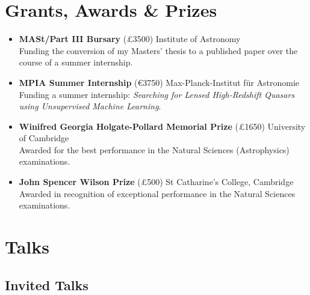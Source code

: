 \documentclass[a4paper,10pt]{article}
\begin{document}
\section*{Grants, Awards \& Prizes}
\begin{itemize}
    \item \textbf{MASt/Part III Bursary} (£3500) \hfill Institute of Astronomy\\
    Funding the conversion of my Masters' thesis to a published paper over the course of a summer internship.
    \item \textbf{MPIA Summer Internship} (€3750) \hfill Max-Planck-Institut f\"{u}r Astronomie\\
    Funding a summer internship: \textit{Searching for Lensed High-Redshift Quasars using Unsupervised Machine Learning}.
    \item \textbf{Winifred Georgia Holgate-Pollard Memorial Prize} (£1650)
    \hfill University of Cambridge\\
    Awarded for the best performance in the Natural Sciences (Astrophysics) examinations.
    \item \textbf{John Spencer Wilson Prize} (£500) \hfill St Catharine's College, Cambridge\\
    Awarded in recognition of exceptional performance in the Natural Sciences examinations.
\end{itemize}




\section*{Talks}

\subsection{Invited Talks}

\begin{itemize}
\vspace{1ex}



\end{itemize}
\end{document}
